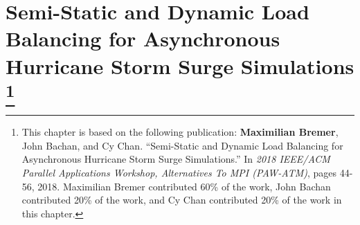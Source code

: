 


\chapter[Semi-Static and Dynamic Load Balancing for Asynchronous Hurricane Storm Surge Simulations]{Semi-Static and Dynamic Load Balancing for Asynchronous Hurricane Storm Surge Simulations%
\footnote{%
This chapter is based on the following publication: {\bf Maximilian Bremer}, John Bachan, and Cy Chan. ``Semi-Static and Dynamic Load Balancing for Asynchronous Hurricane Storm Surge Simulations.'' In {\em 2018 IEEE/ACM Parallel Applications Workshop, Alternatives To MPI (PAW-ATM)}, pages 44-56, 2018. Maximilian Bremer contributed 60\% of the work, John Bachan contributed 20\% of the work, and Cy Chan contributed 20\% of the work in this chapter.}}
\label{ch:lb}









%

%

